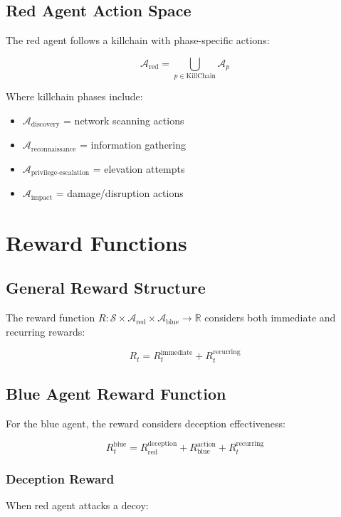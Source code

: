 \documentclass[12pt,a4paper]{article}
\begin{document}
\subsection{Red Agent Action Space}
The red agent follows a killchain with phase-specific actions:

\begin{equation}
\mathcal{A}_{\text{red}} = \bigcup_{p \in \text{KillChain}} \mathcal{A}_p
\end{equation}

Where killchain phases include:
\begin{itemize}
    \item $\mathcal{A}_{\text{discovery}}$ = network scanning actions
    \item $\mathcal{A}_{\text{reconnaissance}}$ = information gathering
    \item $\mathcal{A}_{\text{privilege-escalation}}$ = elevation attempts
    \item $\mathcal{A}_{\text{impact}}$ = damage/disruption actions
\end{itemize}

\section{Reward Functions}

\subsection{General Reward Structure}
The reward function $R: \mathcal{S} \times \mathcal{A}_{\text{red}} \times \mathcal{A}_{\text{blue}} \rightarrow \mathbb{R}$ considers both immediate and recurring rewards:

\begin{equation}
R_t = R_t^{\text{immediate}} + R_t^{\text{recurring}}
\end{equation}

\subsection{Blue Agent Reward Function}
For the blue agent, the reward considers deception effectiveness:

\begin{equation}
R_t^{\text{blue}} = R_{\text{red}}^{\text{deception}} + R_{\text{blue}}^{\text{action}} + R_t^{\text{recurring}}
\end{equation}

\subsubsection{Deception Reward}
When red agent attacks a decoy:
\end{document}
